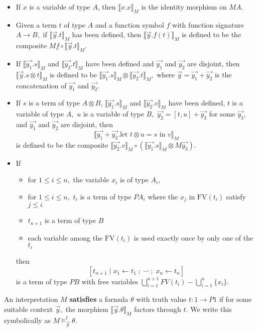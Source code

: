 \documentclass{article}
\newcommand{\maps}{\colon}
\newcommand{\interp}[1]{\llbracket #1 \rrbracket}
\newcommand{\FV}{\mbox{FV}}
\newcommand{\iym}[1]{\interp{\vec{y}.#1}_M}
\newcommand{\iymm}[2]{\interp{\vec{y_{#1}}.#2}_M}
\begin{document}
\begin{itemize}
  \item If $x$ is a variable of type $A$, then $\interp{x.x}_M$ is the identity morphism on $MA.$
  \item Given a term $t$ of type $A$ and a function symbol $f$ with function signature $A\to B,$ if $\iym{t}$ has been defined, then $\iym{f(t)}$ is defined to be the composite $Mf \circ \iym{t}.$
  \item If $\iymm{1}{s}$ and $\iymm{2}{t}$ have been defined and $\vec{y_1}$ and $\vec{y_2}$ are disjoint, then $\iym{s \otimes t}$ is defined to be $\iymm{1}{s} \otimes \iymm{2}{t},$ where $\vec{y} = \vec{y_1} + \vec{y_2}$ is the concatenation of $\vec{y_1}$ and $\vec{y_2}.$
  \item If $s$ is a term of type $A \otimes B$, $\iymm{1}{s}$ and $\iymm{2}{v}$ have been defined, $t$ is a variable of type $A,$ $u$ is a variable of type $B,$ $\vec{y_2} = [t, u] + \vec{y_3}$ for some $\vec{y_3},$ and $\vec{y_1}$ and $\vec{y_2}$ are disjoint, then
    \[ \interp{\vec{y_1}+\vec{y_3}.\mbox{let } t \otimes u = s \mbox{ in } v}_M \]
    is defined to be the composite $\iymm{2}{v} \circ (\iymm{1}{s} \otimes M\vec{y_3}).$
  \item If 
    \begin{itemize}
      \item for $1 \le i \le n,$ the variable $x_i$ is of type $A_i,$
      \item for $1 \le i \le n,$ $t_i$ is a term of type $PA_i$ where the $x_j$ in $\FV(t_i)$ satisfy $j \le i$
      \item $t_{n+1}$ is a term of type $B$
      \item each variable among the $\FV(t_i)$ is used exactly once by only one of the $t_i$
    \end{itemize}
    then 
      \[ [t_{n+1} \; |\; x_1 \leftarrow t_1 \;;\; \cdots \;;\; x_n \leftarrow t_n] \]
    is a term of type $PB$ with free variables $\bigcup_{i=1}^{n+1} FV(t_i) - \bigcup_{i=1}^{n} \{ x_i \}.$
\end{itemize}

An interpretation $M$ {\bf satisfies} a formula $\theta$ with truth value $t\maps 1 \to P1$ if for some suitable context $\vec{y},$ the morphism $\iym{\theta}$ factors through $t.$  We write this symbolically as $M \models^t_{\vec{y}} \theta.$
\end{document}
